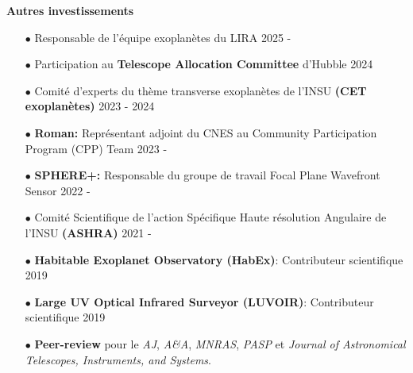 \documentclass[11pt, a4paper, french]{article}
\begin{document}
\textbf{Autres investissements}\\
\vspace{-0.1cm}
\begin{itemize} \itemsep 5pt
    \item[$\bullet$] \small Responsable de l'équipe exoplanètes du LIRA \hfill 2025 - 
    \item[$\bullet$] \small Participation au {\bf Telescope Allocation Committee} d'Hubble \hfill 2024
    \item[$\bullet$] \small Comité d'experts du thème transverse exoplanètes de l'INSU \textbf{(CET exoplanètes)} \hfill 2023 - 2024
    \item[$\bullet$] \small \textbf{Roman:} Représentant adjoint du CNES au Community Participation Program (CPP) Team \hfill 2023 - 
    \item[$\bullet$] \small \textbf{SPHERE+:} Responsable du groupe de travail Focal Plane Wavefront Sensor \hfill 2022 - 
    \item[$\bullet$] \small Comité Scientifique de l'action Spécifique Haute résolution Angulaire de l'INSU \textbf{(ASHRA)} \hfill 2021 - 
    \item[$\bullet$] \small \textbf{Habitable Exoplanet Observatory (HabEx)}: Contributeur scientifique \hfill 2019
    \item[$\bullet$] \small \textbf{Large UV Optical Infrared Surveyor (LUVOIR)}: Contributeur scientifique \hfill 2019
    \item[$\bullet$] \small \textbf{Peer-review} pour le \textit{AJ}, \textit{A\&A}, \textit{MNRAS}, \textit{PASP} et \textit{Journal of Astronomical Telescopes, Instruments, and Systems}.
\end{itemize}
\end{document}
